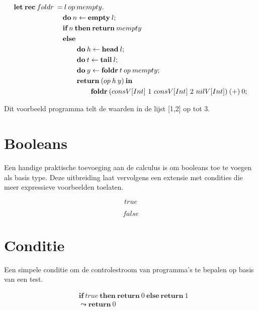 \begin{equation} \label{eq: sumEx}
    \begin{split}
        \textbf{let\:rec}\:foldr\:= &\:l\:op\:mempty.\: \\
        & \textbf{do}\:n\leftarrow \textbf{empty}\:l; \\
        & \textbf{if}\:n\:\textbf{then}\:\textbf{return}\:mempty \\
        & \textbf{else} \\
        & \qquad \textbf{do}\:h \leftarrow \textbf{head}\:l;\\
        & \qquad \textbf{do}\:t \leftarrow \textbf{tail}\:l; \\
        & \qquad \textbf{do}\:y \leftarrow \textbf{foldr}\:t\:op\:mempty    ; \\
        & \qquad \textbf{return}\:(op\:h\:y)\:\textbf{in} \\
        & \qquad \qquad \textbf{foldr}\:(consV[Int] \  1 \  consV[Int] \ 2 \ nilV[Int])\:(+)\:0;\\
    \end{split}
\end{equation}

Dit voorbeeld programma telt de waarden in de lijst [1,2] op tot 3.

\section{Booleans}
Een handige praktische toevoeging aan de calculus is om booleans toe te voegen als basis type. Deze uitbreiding laat vervolgens een extensie met condities die meer expressieve voorbeelden toelaten.

\begin{equation}
    true
\end{equation}

\begin{equation}
    false
\end{equation}

\section{Conditie}
Een simpele conditie om de controlestroom van programma's te bepalen op basis van een test.

\begin{equation}
    \begin{split}
        & \textbf{if}\  true \  \textbf{then} \  \textbf{return} \  0 \  \textbf{else} \  \textbf{return} \  1 \\
        & \leadsto \textbf{return}\  0
    \end{split}
\end{equation}

